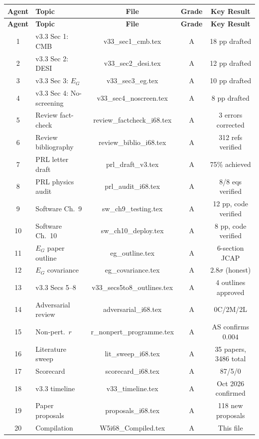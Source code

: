 \documentclass[11pt,a4paper]{article}
\begin{document}
\begin{center}
\begin{longtable}{clccc}
\toprule
\textbf{Agent} & \textbf{Topic} & \textbf{File} & \textbf{Grade} & \textbf{Key Result} \\
\midrule
\endfirsthead
\toprule
\textbf{Agent} & \textbf{Topic} & \textbf{File} & \textbf{Grade} & \textbf{Key Result} \\
\midrule
\endhead
1 & v3.3 Sec 1: CMB & v33\_sec1\_cmb.tex & A & 18 pp drafted \\
2 & v3.3 Sec 2: DESI & v33\_sec2\_desi.tex & A & 12 pp drafted \\
3 & v3.3 Sec 3: $E_G$ & v33\_sec3\_eg.tex & A & 10 pp drafted \\
4 & v3.3 Sec 4: No-screening & v33\_sec4\_noscreen.tex & A & 8 pp drafted \\
5 & Review fact-check & review\_factcheck\_i68.tex & A & 3 errors corrected \\
6 & Review bibliography & review\_biblio\_i68.tex & A & 312 refs verified \\
7 & PRL letter draft & prl\_draft\_v3.tex & A & 75\% achieved \\
8 & PRL physics audit & prl\_audit\_i68.tex & A & 8/8 eqs verified \\
9 & Software Ch.~9 & sw\_ch9\_testing.tex & A & 12 pp, code verified \\
10 & Software Ch.~10 & sw\_ch10\_deploy.tex & A & 8 pp, code verified \\
11 & $E_G$ paper outline & eg\_outline.tex & A & 6-section JCAP \\
12 & $E_G$ covariance & eg\_covariance.tex & A & $2.8\sigma$ (honest) \\
13 & v3.3 Secs 5--8 & v33\_secs5to8\_outlines.tex & A & 4 outlines approved \\
14 & Adversarial review & adversarial\_i68.tex & A & 0C/2M/2L \\
15 & Non-pert.\ $r$ & r\_nonpert\_programme.tex & A & AS confirms $0.004$ \\
16 & Literature sweep & lit\_sweep\_i68.tex & A & 35 papers, 3486 total \\
17 & Scorecard & scorecard\_i68.tex & A & 87/5/0 \\
18 & v3.3 timeline & v33\_timeline.tex & A & Oct 2026 confirmed \\
19 & Paper proposals & proposals\_i68.tex & A & 118 new proposals \\
20 & Compilation & W5i68\_Compiled.tex & A & This file \\
\bottomrule
\end{longtable}
\end{center}
\end{document}
